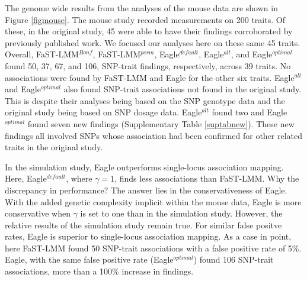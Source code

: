\documentclass{article}
\begin{document}
  
The genome wide results from the analyses of the mouse data are shown in Figure  \ref{figmouse}. The mouse study recorded
measurements on 200 traits. Of these, in the original study, 45 were able to have their findings  corroborated by previously published work. We focused 
our analyses here on these same 45 traits. Overall,  FaST-LMM$^{Bonf}$,  FaST-LMM$^{perm}$, Eagle$^{default}$, Eagle$^{alt}$, and Eagle$^{optimal}$ found 50, 37, 67, and 106, SNP-trait findings, respectively, across 39 traits. No associations were found by FaST-LMM and Eagle for the other six traits. 
Eagle$^{alt}$ and Eagle$^{optimal}$ also found SNP-trait associations not found in the original study. This is despite their analyses being based 
on the SNP genotype data and the original study being based on SNP dosage data. Eagle$^{alt}$ found two  and 
Eagle$^{optimal}$ found seven new findings (Supplementary Table \ref{suptabnew}).  These new findings all involved SNPs whose association had been confirmed for other related traits in the original 
study. 

In the simulation study, Eagle outperforms single-locus association mapping. Here, Eagle$^{default}$, where $\gamma=1$, finds less associations 
than FaST-LMM. Why the discrepancy in performance?   The answer lies in the conservativeness of Eagle.  With the added genetic complexity implicit within the mouse data, Eagle is more conservative when $\gamma$ is set to one than in the simulation study.  However, the relative results of the simulation study remain true. For similar false positve rates, Eagle is superior to single-locus association mapping. As a case in point, here FaST-LMM found 50 SNP-trait associations with a false positive rate of 5\%. Eagle, with the same false positive rate (Eagle$^{optimal}$) found 106 SNP-trait associations, more 
than a 100\% increase in findings. 
\end{document}

